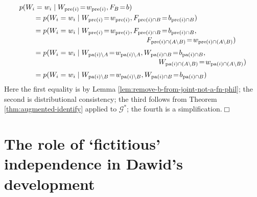 \documentclass[11pt]{article}
\DeclareMathOperator{\pa}{pa}
\DeclareMathOperator{\pre}{pre}
\newcommand{\G}{{\mathscr G}}
\begin{document}
{ 
\begin{align}
\MoveEqLeft{p(W_i =w_i \mid W_{\pre(i)}\!=\! w_{\pre(i)}, F_{B}\!=\!b) }\nonumber\\
&= p(W_i =w_i \mid W_{\pre(i)}\!=\! w_{\pre(i)}, F_{\pre(i)\cap B}\!=\!b_{\pre(i)\cap B})\nonumber\\[3pt]
&= p(W_i =w_i \mid W_{\pre(i)}\!=\! w_{\pre(i)}, F_{\pre(i)\cap B}\!=\!b_{\pre(i)\cap B},\nonumber\\[-2pt]
&\kern158pt F_{\pre(i)\cap (A\setminus B)}\!=\!w_{\pre(i)\cap (A\setminus B)})\nonumber\\[3pt]
&= p(W_i =w_i \mid W_{\pa(i)\setminus A}\!=\! w_{\pa(i)\setminus A}, W_{\pa(i)\cap B}\!=\! b_{\pa(i)\cap B},\nonumber\\[-2pt]
&\kern175pt W_{\pa(i)\cap ( A\setminus B) }\!=\! w_{\pa(i)\cap (A\setminus B)}) \nonumber\\[3pt]
&= p(W_i =w_i \mid W_{\pa(i)\setminus B}\!=\! w_{\pa(i)\setminus B},
W_{\pa(i)\cap B}\!=\! b_{\pa(i)\cap B}) \nonumber
\end{align}
Here the first equality is by Lemma \ref{lem:remove-b-from-joint-not-a-fn-phil}; the second is distributional consistency; the third follows from Theorem \ref{thm:augmented-identify} applied to $\G^*$; the fourth is a simplification.\hfill$\Box$





\section{The role of `fictitious' independence in Dawid's development}

}
\end{document}
